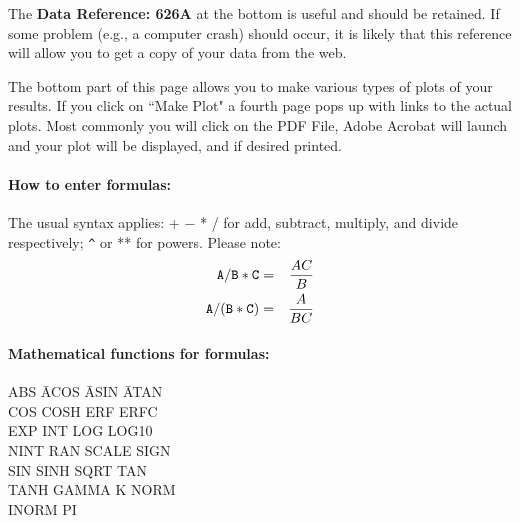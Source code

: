 The {\small \bf Data Reference: 626A} at the bottom is useful and should be retained.  
If some problem (e.g., a computer crash) should occur, it is likely that this reference
will allow you to get a copy of your data from the web.

The bottom part of this page allows you to make various types of plots of your results.
If you click on ``Make Plot" a fourth page pops up with links to the actual plots.
Most commonly you will click on the PDF File, Adobe Acrobat will launch and your plot
will be displayed, and if desired printed.


\paragraph*{How to enter formulas:}
The usual syntax applies: + $-$ * / for add, subtract,
multiply, and divide respectively; \verb+^+ or ** for powers.  
Please note:
\begin{eqnarray}
{\tt A/B*C} &=& {AC\over B}\\
{\tt A/(B*C)} &=& {A\over BC}
\end{eqnarray}

\paragraph*{Mathematical functions for formulas:}
\begin{tabbing}
ABS \hspace*{1in} \=  ACOS \hspace*{1in}  \= ASIN \hspace*{1in} \=  ATAN \\
COS    \>  COSH  \>  ERF  \>  ERFC \\
EXP     \>  INT   \>  LOG   \>  LOG10   \\
NINT     \>  RAN   \>  SCALE     \>  SIGN  \\
SIN    \>  SINH   \>  SQRT    \>  TAN  \\
TANH       \>  GAMMA \>  K   \>  NORM \\
INORM     \>  PI \\
\end{tabbing}

